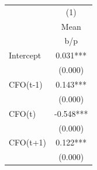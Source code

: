 {
\def\sym#1{\ifmmode^{#1}\else\(^{#1}\)\fi}
\begin{tabular}{l*{1}{c}}
\hline\hline
                    &\multicolumn{1}{c}{(1)}\\
                    &\multicolumn{1}{c}{Mean}\\
                    &         b/p   \\
\hline
Intercept           &       0.031***\\
                    &     (0.000)   \\
CFO(t-1)            &       0.143***\\
                    &     (0.000)   \\
CFO(t)              &      -0.548***\\
                    &     (0.000)   \\
CFO(t+1)            &       0.122***\\
                    &     (0.000)   \\
\hline\hline
\end{tabular}
}
